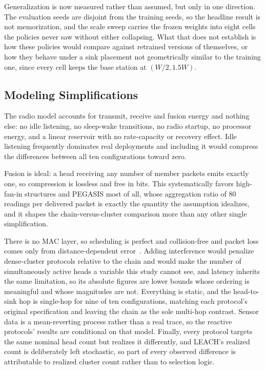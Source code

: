 Generalization is now measured rather than assumed, but only in one direction.
The evaluation seeds are disjoint from the training seeds, so the headline
result is not memorization, and the scale sweep carries the frozen weights into
eight cells the policies never saw without either collapsing. What that does not
establish is how these policies would compare against retrained versions of
themselves, or how they behave under a sink placement not geometrically similar
to the training one, since every cell keeps the base station at $(W/2, 1.5W)$.

\subsection{Modeling Simplifications}

The radio model accounts for transmit, receive and fusion energy and nothing
else: no idle listening, no sleep-wake transitions, no radio startup, no
processor energy, and a linear reservoir with no rate-capacity or recovery
effect. Idle listening frequently dominates real deployments and including it
would compress the differences between all ten configurations toward zero.

Fusion is ideal: a head receiving any number of member packets emits exactly
one, so compression is lossless and free in bits. This systematically favors
high-fan-in structures and PEGASIS most of all, whose aggregation ratio of 80
readings per delivered packet is exactly the quantity the assumption idealizes,
and it shapes the chain-versus-cluster comparison more than any other single
simplification.

There is no MAC layer, so scheduling is perfect and collision-free and packet
loss comes only from distance-dependent
error~\cite{zhao2003understanding,woo2003taming}. Adding interference would
penalize dense-cluster protocols relative to the chain and would make the number
of simultaneously active heads a variable this study cannot see, and latency
inherits the same limitation, so its absolute figures are lower bounds whose
ordering is meaningful and whose magnitudes are not. Everything is static, and
the head-to-sink hop is single-hop for nine of ten configurations, matching each
protocol's original specification and leaving the chain as the sole multi-hop
contrast. Sensor data is a mean-reverting process rather than a real trace, so
the reactive protocols' results are conditional on that model. Finally, every
protocol targets the same nominal head count but realizes it differently, and
LEACH's realized count is deliberately left stochastic, so part of every
observed difference is attributable to realized cluster count rather than to
selection logic.

